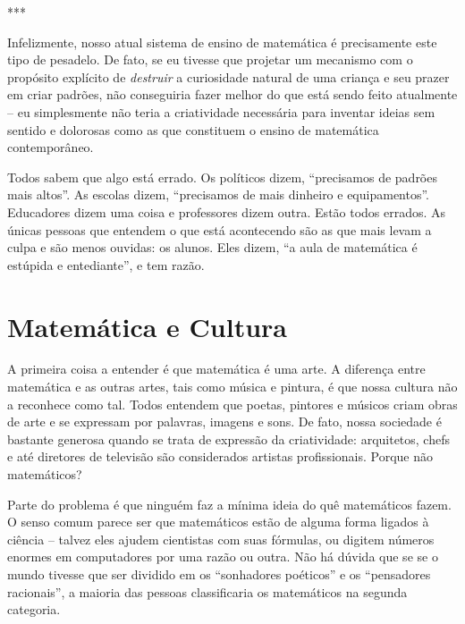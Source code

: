 \documentclass[a4paper,oneside,12pt,notitlepage]{article}
\begin{document}
\vspace{1em}

\begin{center}
***
\end{center}

\vspace{1em}

Infelizmente, nosso atual sistema de ensino de matemática é precisamente este tipo de pesadelo.
De fato, se eu tivesse que projetar um mecanismo com o propósito explícito de \textsl{destruir} a curiosidade natural de uma criança e seu prazer em criar padrões, não conseguiria fazer melhor do que está sendo feito atualmente -- eu simplesmente não teria a criatividade necessária para inventar ideias sem sentido e dolorosas como as que constituem o ensino de matemática contemporâneo.

Todos sabem que algo está errado.
Os políticos dizem, ``precisamos de padrões mais altos''.
As escolas dizem, ``precisamos de mais dinheiro e equipamentos''.
Educadores dizem uma coisa e professores dizem outra.
Estão todos errados.
As únicas pessoas que entendem o que está acontecendo são as que mais levam a culpa e são menos ouvidas: os alunos.
Eles dizem, ``a aula de matemática é estúpida e entediante'', e tem razão.

\section*{Matemática e Cultura}

A primeira coisa a entender é que matemática é uma arte.
A diferença entre matemática e as outras artes, tais como música e pintura, é que nossa cultura não a reconhece como tal.
Todos entendem que poetas, pintores e músicos criam obras de arte e se expressam por palavras, imagens e sons.
De fato, nossa sociedade é bastante generosa quando se trata de expressão da criatividade: arquitetos, chefs e até diretores de televisão são considerados artistas profissionais. %
Porque não matemáticos?

Parte do problema é que ninguém faz a mínima ideia do quê matemáticos fazem.
O senso comum parece ser que matemáticos estão de alguma forma ligados à ciência -- talvez eles ajudem cientistas com suas fórmulas, ou digitem números enormes em computadores por uma razão ou outra.
Não há dúvida que se se o mundo tivesse que ser dividido em os ``sonhadores poéticos'' e os ``pensadores racionais'', a maioria das pessoas classificaria os matemáticos na segunda categoria.
\end{document}
